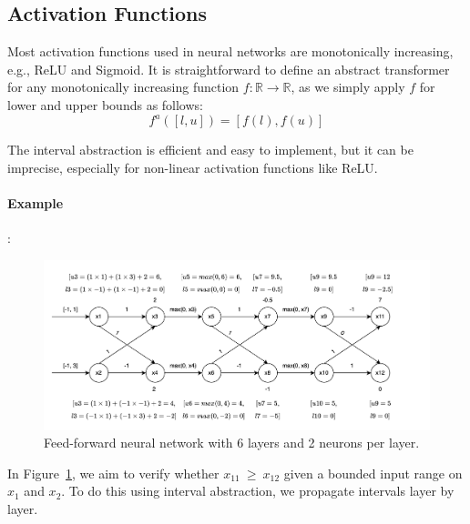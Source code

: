 \documentclass[oneside,11pt,dvipsnames]{book}
\numberwithin{equation}{section}
\theoremstyle{definition}
\theoremstyle{remark}
\begin{document}

\subsection{Activation Functions}

Most activation functions used in neural networks are monotonically increasing, e.g., ReLU and Sigmoid. It is straightforward to define
an abstract transformer for any monotonically increasing function \(f : \mathbb{R} \to \mathbb{R}\), as we simply apply \(f\) for lower and upper bounds as follows:
\[f^a
([l, u]) = [ f(l), f(u)]
\]

The interval abstraction is efficient and easy to implement, but it can be imprecise, especially for non-linear activation functions like ReLU. 

\paragraph{Example}: 


\begin{figure}[h]
    \centering
    \includegraphics[width=1.2\linewidth]{figure/2_layers_example.png}
    \caption{Feed-forward neural network with 6 layers and 2 neurons per layer.}
    \label{fig:interval-network}
\end{figure}
In Figure~\ref{fig:interval-network}, we aim to verify whether \(x_{11}\ \geq\ x_{12}\) given a bounded input range on \(x_1\) and \(x_2\). To do this using interval abstraction, we propagate intervals layer by layer.
\end{document}

